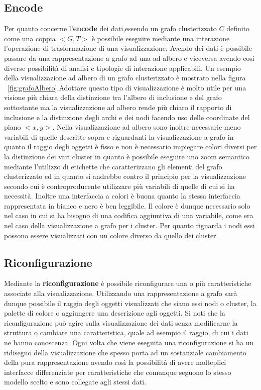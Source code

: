 {\subsection{Encode}
Per quanto concerne l'\textbf{encode} dei dati,essendo un grafo clusterizzato $C$ definito come una coppia $<G,T>$ è possibile eseguire mediante una interazione l'operazione di trasformazione di una visualizzazione. Avendo dei dati è possibile passare da una rappresentazione a grafo ad una ad albero e viceversa avendo cosi diverse possibilità di analisi e tipologie di interazione applicabili. Un esempio della visualizzazione ad albero di un grafo clusterizzato è mostrato nella figura \figurename~\ref{fig:grafoAlbero}.Adottare questo tipo di visualizzazione è molto utile per una visione più chiara della distinzione tra l'albero di inclusione e del grafo sottostante ma la visualizzazione ad albero rende più chiaro il rapporto di inclusione e la distinzione degli archi e dei nodi facendo uso delle coordinate del piano $<x,y>$. Nella visualizzazione ad albero sono inoltre necessarie meno variabili di quelle descritte sopra e riguardanti la visualizzazione a grafo in quanto il raggio degli oggetti è fisso e non è necessario impiegare colori diversi per la distinzione dei vari cluster in quanto è possibile eseguire uno zoom semantico mediante l'utilizzo di etichette che caratterizzano gli elementi del grafo clusterizzato ed in quanto si andrebbe contro il principio per la visualizzazione secondo cui è controproducente utilizzare più variabili di quelle di cui si ha necessità. Inoltre una interfaccia a colori è buona quanto la stessa interfaccia rappresentata in bianco	e nero è ben leggibile. Il colore è dunque necessario solo nel caso in cui si ha bisogno di una codifica aggiuntiva di una variabile, come era nel caso della visualizzazione a grafo per i cluster. Per quanto riguarda i nodi essi possono essere visualizzati con un colore diverso da quello dei cluster.
\subsection{Riconfigurazione}
Mediante la \textbf{riconfigurazione} è possibile riconfigurare una o più caratteristiche associate alla visualizzazione. Utilizzando una rappresentazione a grafo sarà dunque possibile il raggio degli oggetti visualizzati che siano essi nodi o cluster, la palette di colore o aggiungere una descrizione agli oggetti. Si noti che la riconfigurazione può agire sulla visualizzazione dei dati senza modificarne la struttura o cambiare una caratteristica, quale ad esempio il raggio, di cui i dati ne hanno conoscenza. Ogni volta che viene eseguita una riconfigurazione si ha un ridisegno della visualizzazione che spesso porta ad un sostanziale cambiamento della pura rappresentazione avendo così la possibilità di avere molteplici interfacce differenziate per caratteristiche che comunque seguono lo stesso modello scelto e sono collegate agli stessi dati.
}

